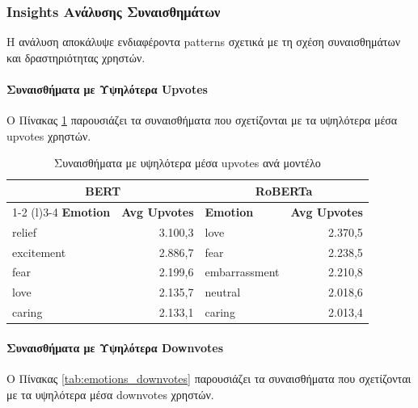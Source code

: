 \documentclass[a4paper,11pt,oneside,openany]{ioniothesis}
\begin{document}
\subsubsection{Insights Ανάλυσης Συναισθημάτων}
\label{sec:Insights Ανάλυσης Συναισθημάτων}

Η ανάλυση αποκάλυψε ενδιαφέροντα patterns σχετικά με τη σχέση συναισθημάτων και δραστηριότητας χρηστών.

\paragraph{Συναισθήματα με Υψηλότερα Upvotes}

Ο Πίνακας \ref{tab:emotions_upvotes} παρουσιάζει τα συναισθήματα που σχετίζονται με τα υψηλότερα μέσα upvotes χρηστών.

\begin{table}[H]
\centering
\caption{Συναισθήματα με υψηλότερα μέσα upvotes ανά μοντέλο}
\label{tab:emotions_upvotes}
\begin{tabular}{@{}lrlr@{}}
\toprule
\multicolumn{2}{c}{\textbf{BERT}} & \multicolumn{2}{c}{\textbf{RoBERTa}} \\
\cmidrule(r){1-2} \cmidrule(l){3-4}
\textbf{Emotion} & \textbf{Avg Upvotes} & \textbf{Emotion} & \textbf{Avg Upvotes} \\
\midrule
relief & 3.100,3 & love & 2.370,5 \\
excitement & 2.886,7 & fear & 2.238,5 \\
fear & 2.199,6 & embarrassment & 2.210,8 \\
love & 2.135,7 & neutral & 2.018,6 \\
caring & 2.133,1 & caring & 2.013,4 \\
\bottomrule
\end{tabular}
\end{table}

\paragraph{Συναισθήματα με Υψηλότερα Downvotes}

Ο Πίνακας \ref{tab:emotions_downvotes} παρουσιάζει τα συναισθήματα που σχετίζονται με τα υψηλότερα μέσα downvotes χρηστών.
\end{document}
